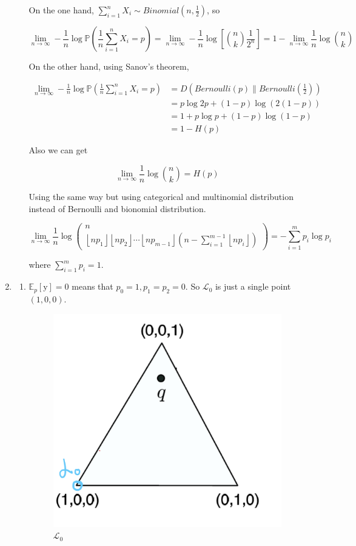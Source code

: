 \documentclass[a4paper]{article}
\begin{document}
\begin{enumerate}
\begin{enumerate}
On the one hand, $\sum_{i=1}^n X_i \sim Binomial(n,\frac 1 2)$, so 

\begin{equation}
  \lim_{n\to \infty} -\frac{1}{n} \log \mathbb{P}(\frac{1}{n} \sum_{i=1}^n X_i= p) = \lim_{n\to \infty} -\frac{1}{n} \log \left[\binom{n}{k} \frac 1 {2^n}\right]  = 1 - \lim_{n\to \infty} \frac{1}{n} \log \binom{n}{k}
\end{equation}

On the other hand, using Sanov's theorem,

\begin{equation}
  \begin{aligned}
    \lim_{n\to \infty} -\frac{1}{n} \log \mathbb{P}(\frac{1}{n} \sum_{i=1}^n X_i= p)   & = D(Bernoulli(p) \| Bernoulli(\frac 1 2)) \\ & = p\log 2p + (1-p) \log(2(1-p))  \\ & = 1 + p\log p  + (1-p) \log (1-p)  \\ & = 1- H(p)
  \end{aligned}
\end{equation}

Also we can get 

\begin{equation}
  \lim_{n\to \infty} \frac{1}{n} \log \binom{n}{k} = H(p)
\end{equation}


Using the same way but using categorical and multinomial distribution instead of Bernoulli and  bionomial distribution.

\begin{equation}
  \lim _{n \rightarrow \infty} \frac{1}{n} \log \left(\begin{array}{c}n \\ \left\lfloor n p_{1}\right\rfloor\left\lfloor n p_{2}\right\rfloor \cdots\left\lfloor n p_{m-1}\right\rfloor\left(n-\sum_{i=1}^{m-1}\left\lfloor n p_{i}\right\rfloor\right)\end{array}\right) = -\sum_{i=1}^m p_i \log p_i
\end{equation}

where $\sum_{i=1}^m p_i = 1$.

\end{enumerate}

\item \begin{enumerate}
  \item $\mathbb{E}_p[\mathrm{y}] = 0$ means that $p_0 = 1,p_1=p_2 = 0$. So $\mathcal{L}_0$ is just a single point $(1,0,0)$.
  \begin{figure}[!htbp]
    \centering
    \includegraphics[width = 0.3\linewidth]{3-1.jpg}
    \caption{$\mathcal{L}_0$}
  \end{figure}


\end{enumerate}
\end{enumerate}
\end{document}
